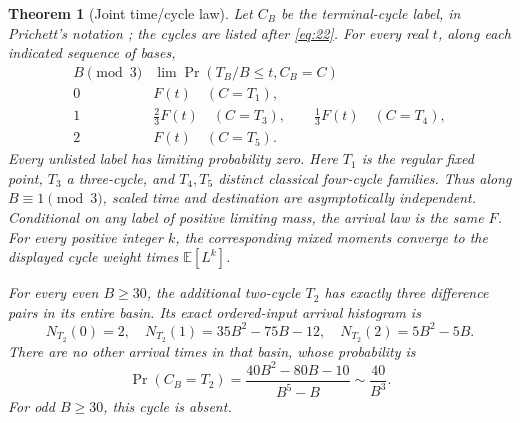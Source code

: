 \documentclass[11pt]{amsart}
\newtheorem{theorem}{Theorem}
\begin{document}
\begin{theorem}[Joint time/cycle law]\label{thm:3}
Let \(C_B\) be the terminal-cycle label, in Prichett's notation \cite[Tables~4.1--4.3]{Pri}; the cycles are listed after \eqref{eq:22}. For every real \(t\), along each indicated sequence of bases, \begin{equation}\label{eq:6}
\begin{array}{c|c}
 B\pmod3&\displaystyle\lim\Pr(T_B/B\le t,C_B=C)\\\hline
 0&F(t)\quad(C=T_1),\\
 1&\tfrac23F(t)\quad(C=T_3),\qquad
       \tfrac13F(t)\quad(C=T_4),\\
 2&F(t)\quad(C=T_5).
\end{array}
\end{equation} Every unlisted label has limiting probability zero. Here \(T_1\) is the regular fixed point, \(T_3\) a three-cycle, and \(T_4,T_5\) distinct classical four-cycle families. Thus along \(B\equiv1\pmod3\), scaled time and destination are asymptotically independent. Conditional on any label of positive limiting mass, the arrival law is the same \(F\). For every positive integer \(k\), the corresponding mixed moments converge to the displayed cycle weight times \(\mathbb E[L^k]\).

For every even \(B\ge30\), the additional two-cycle \(T_2\) has exactly three difference pairs in its entire basin. Its exact ordered-input arrival histogram is \begin{equation}\label{eq:7}
N_{T_2}(0)=2,\quad
 N_{T_2}(1)=35B^2-75B-12,\quad
 N_{T_2}(2)=5B^2-5B.
\end{equation} There are no other arrival times in that basin, whose probability is \begin{equation}\label{eq:8}
\Pr(C_B=T_2)=\frac{40B^2-80B-10}{B^5-B}\sim\frac{40}{B^3}.
\end{equation} For odd \(B\ge30\), this cycle is absent.
\end{theorem}
\end{document}
